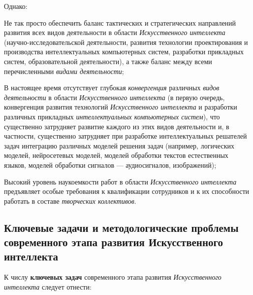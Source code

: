 Однако:
\begin{textitemize}
	\item
	Не так просто обеспечить баланс тактических и стратегических направлений развития всех видов деятельности в области \textit{Искусственного интеллекта} (научно-исследовательской деятельности, развития технологии проектирования и производства интеллектуальных компьютерных систем, разработки прикладных систем, образовательной деятельности), а также баланс между всеми перечисленными \textit{видами деятельности};
	\item
	В настоящее время отсутствует глубокая \textit{конвергенция} различных \textit{видов деятельности} в области \textit{Искусственного интеллекта} (в первую очередь, конвергенция развития технологий \textit{Искусственного интеллекта} и разработки различных прикладных \textit{интеллектуальных компьютерных систем}), что существенно затрудняет развитие каждого из этих видов деятельности и, в частности, существенно затрудняет при разработке интеллектуальных решателей задач интеграцию различных моделей решения задач (например, логических моделей, нейросетевых моделей, моделей обработки текстов естественных языков, моделей обработки сигналов --- аудиосигналов, изображений);
	\item
	Высокий уровень наукоемкости работ в области \textit{Искусственного интеллекта} предъявляет особые требования к квалификации сотрудников и к их способности работать в составе \textit{творческих коллективов}.
\end{textitemize}

\subsection{Ключевые задачи и методологические проблемы современного этапа развития Искусственного интеллекта}
\label{subsec_key_tasks_and_methodological_problems_current_stage_development_AI}

К числу \textbf{ключевых задач} современного этапа развития \textit{Искусственного интеллекта} следует отнести:

